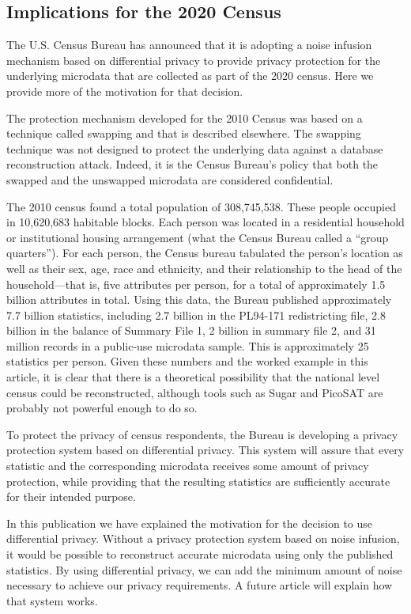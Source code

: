 \documentclass[runningheads]{llncs}
\begin{document}
\subsection{Implications for the 2020 Census}

The U.S. Census Bureau has announced that it is adopting a noise
infusion mechanism based on differential privacy to provide privacy
protection for the underlying microdata that are collected as part of
the 2020 census. Here we provide more of the motivation for that
decision. 

The protection mechanism developed for the 2010 Census was based on a
technique called swapping and that is described
elsewhere\cite{swapping}. The swapping technique was not designed to
protect the underlying data against a database reconstruction
attack. Indeed, it is the Census Bureau's policy that both the swapped
and the unswapped microdata are considered confidential.

The 2010 census found a total population of 308,745,538. These people
occupied in 10,620,683 habitable blocks. Each person was located in a
residential household or institutional housing arrangement (what the
Census Bureau called a ``group quarters''). For each person, the Census
bureau tabulated the person's location as well as their sex, age,
race and ethnicity, and their relationship
to the head of the household---that is, five attributes per person,
for a total of approximately 1.5 billion attributes in total. Using
this data, the Bureau published approximately 7.7 billion statistics,
including 2.7 billion in the PL94-171 redistricting file, 2.8 billion
in the balance of Summary File 1, 2 billion in summary file 2, and 31
million records in a public-use microdata sample. This is
approximately 25 statistics per person. Given these numbers and the
worked example in this article, it is clear that there is a
theoretical possibility that the national level census could be
reconstructed, although tools such as Sugar and PicoSAT are probably
not powerful enough to do so.

To protect the privacy of census respondents, the Bureau is developing
a privacy protection system based on differential privacy. This system
will assure that every statistic and the corresponding microdata
receives some amount of privacy protection, while providing that the
resulting statistics are sufficiently accurate for their intended
purpose.

In this publication we have explained the motivation for the decision
to use differential privacy. Without a privacy
protection system based on noise infusion, it would be possible to
reconstruct accurate microdata using only the published statistics. By
using differential privacy, we can add the minimum amount of noise
necessary to achieve our privacy requirements. A future article will
explain how that system works.
\end{document}
